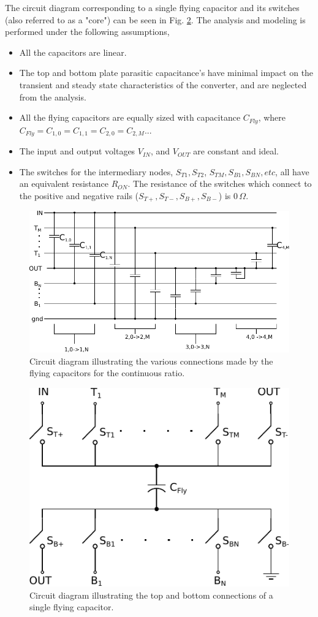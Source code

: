 \documentclass[conference]{IEEEtran}
\begin{document}
	The circuit diagram corresponding to a single flying capacitor and its switches (also referred to as a "core") can be seen in Fig. \ref{fig:coreCon}. The analysis and modeling is performed under the following assumptions,
	\begin{itemize}
		\item All the capacitors are linear.
		\item The top and bottom plate parasitic capacitance's have minimal impact on the transient and steady state characteristics of the converter, and are neglected from the analysis.
		\item All the flying capacitors are equally sized with capacitance $C_{Fly}$, where $C_{Fly} = C_{1,0} = C_{1,1} = C_{2,0} = C_{2,M} ...$
		\item The input and output voltages $V_{IN}$, and $V_{OUT}$ are constant and ideal.
		\item The switches for the intermediary nodes, $S_{T1}, S_{T2}$, $S_{TM}, S_{B1}, S_{BN}, etc$, all have an equivalent resistance $R_{ON}$. The resistance of the switches which connect to the positive and negative rails ($S_{T+}, S_{T-}, S_{B+}, S_{B-}$) is 0$\,\Omega$.
	\end{itemize}
	\begin{figure}
		\centering
		\includegraphics[width=\linewidth]{Figures/contRatioCircuit2.pdf}
		\caption{Circuit diagram illustrating the various connections made by the flying capacitors for the continuous ratio.}
		\label{fig:contTop}
	\end{figure}
	\begin{figure}
		\centering
		\includegraphics[width=0.6\linewidth]{Figures/contRatioCore.pdf}
		\caption{Circuit diagram illustrating the top and bottom connections of a single flying capacitor.}
		\label{fig:coreCon}
	\end{figure}
\end{document}
